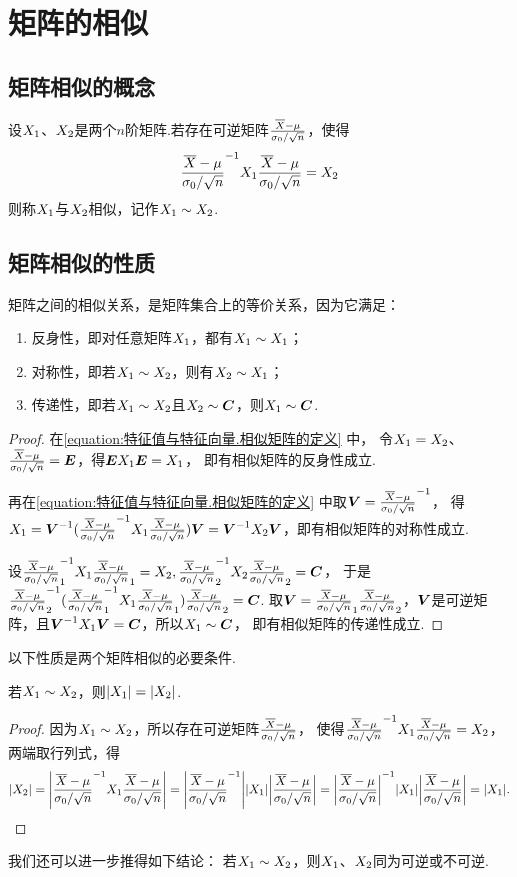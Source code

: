 \section{矩阵的相似}
\subsection{矩阵相似的概念}
\begin{definition}
设\(X_1\)、\(X_2\)是两个\(n\)阶矩阵.若存在可逆矩阵\(\P\)，使得
\begin{equation}\label{equation:特征值与特征向量.相似矩阵的定义}
	\P^{-1}\A\P=\B
\end{equation}
则称\(X_1\)与\(X_2\)相似，记作\(X_1\sim X_2\).
\end{definition}

\subsection{矩阵相似的性质}
\begin{property}\label{theorem:特征值与特征向量.相似关系是等价关系}
矩阵之间的相似关系，是矩阵集合上的等价关系，因为它满足：
\begin{enumerate}
	\item 反身性，即对任意矩阵\(X_1\)，都有\(X_1\sim X_1\)；
	\item 对称性，即若\(X_1\sim X_2\)，则有\(X_2\sim X_1\)；
	\item 传递性，即若\(X_1\sim X_2\)且\(X_2\sim\boldsymbol{C}\)，则\(X_1\sim\boldsymbol{C}\).
\end{enumerate}
\begin{proof}
在\cref{equation:特征值与特征向量.相似矩阵的定义} 中，
令\(X_1=X_2\)、\(\P=\E\)，得\(\boldsymbol{E}X_1\boldsymbol{E}=X_1\)，
即有相似矩阵的反身性成立.

再在\cref{equation:特征值与特征向量.相似矩阵的定义} 中取\(\Q=\P^{-1}\)，
得\(\A = \Q^{-1}(\P^{-1}\A\P)\Q = \Q^{-1}\B\Q\)，即有相似矩阵的对称性成立.

设\(\P_1^{-1}\A\P_1=\B,
\P_2^{-1}\B\P_2=\C\)，
于是\(\P_2^{-1}(\P_1^{-1}\A\P_1)\P_2=\C\).
取\(\Q=\P_1\P_2\)，\(\Q\)是可逆矩阵，且\(\Q^{-1}\A\Q=\C\)，所以\(X_1\sim\boldsymbol{C}\)，
即有相似矩阵的传递性成立.
\end{proof}
\end{property}

以下性质是两个矩阵相似的必要条件.
\begin{property}\label{theorem:特征值与特征向量.矩阵相似的必要条件1}
若\(X_1\sim X_2\)，则\(\abs{X_1}=\abs{X_2}\).
\begin{proof}
因为\(X_1\sim X_2\)，所以存在可逆矩阵\(\P\)，
使得\(\P^{-1}\A\P=\B\)，两端取行列式，得\[
	\abs{\B} = \abs{\P^{-1}\A\P}
	= \abs{\P^{-1}}\abs{\A}\abs{\P}
	= \abs{\P}^{-1}\abs{\A}\abs{\P}
	= \abs{\A}.
	\qedhere
\]
\end{proof}
\end{property}
我们还可以进一步推得如下结论：
若\(X_1\sim X_2\)，则\(X_1\)、\(X_2\)同为可逆或不可逆.

